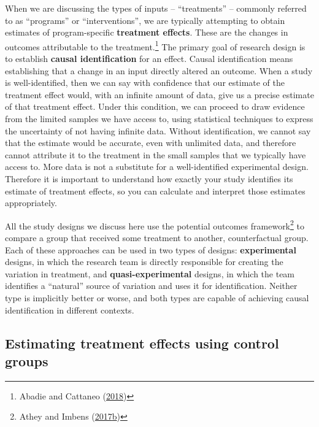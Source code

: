 \documentclass[
]{book}
\begin{document}
When we are discussing the types of inputs -- ``treatments'' -- commonly referred to as
``programs'' or ``interventions'', we are typically attempting to obtain estimates
of program-specific \textbf{treatment effects}.
These are the changes in outcomes attributable to the treatment.\footnote{Abadie and Cattaneo (\protect\hyperlink{ref-abadie2018econometric}{2018})}
The primary goal of research design is to establish \textbf{causal identification} for an effect.
Causal identification means establishing that a change in an input directly altered an outcome.
When a study is well-identified, then we can say with confidence
that our estimate of the treatment effect would,
with an infinite amount of data,
give us a precise estimate of that treatment effect.
Under this condition, we can proceed to draw evidence from the limited samples we have access to,
using statistical techniques to express the uncertainty of not having infinite data.
Without identification, we cannot say that the estimate would be accurate,
even with unlimited data, and therefore cannot attribute it to the treatment
in the small samples that we typically have access to.
More data is not a substitute for a well-identified experimental design.
Therefore it is important to understand how exactly your study
identifies its estimate of treatment effects,
so you can calculate and interpret those estimates appropriately.

All the study designs we discuss here use the potential outcomes framework\footnote{Athey and Imbens (\protect\hyperlink{ref-athey2017state}{2017}\protect\hyperlink{ref-athey2017state}{b})}
to compare a group that received some treatment to another, counterfactual group.
Each of these approaches can be used in two types of designs:
\textbf{experimental} designs, in which the research team
is directly responsible for creating the variation in treatment,
and \textbf{quasi-experimental} designs, in which the team
identifies a ``natural'' source of variation and uses it for identification.
Neither type is implicitly better or worse,
and both types are capable of achieving causal identification in different contexts.

\hypertarget{estimating-treatment-effects-using-control-groups}{%
\subsection*{Estimating treatment effects using control groups}\label{estimating-treatment-effects-using-control-groups}}
\end{document}
